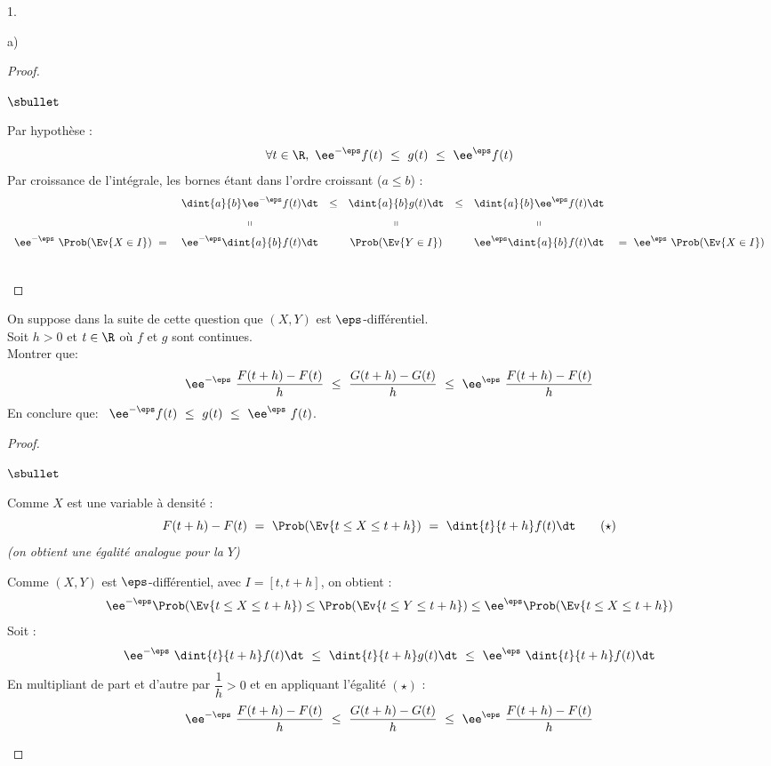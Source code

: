 \documentclass[11pt]{article}%
\begin{document}
\begin{noliste}{1.}
\begin{noliste}{a)}
\begin{proof}
\begin{noliste}{$\sbullet$}
      \item Par hypothèse : 
        \[
        \forall t \in \R, \ \ee^{-\eps} f(t) \ \leq \ g(t) \ \leq \
        \ee^{\eps}f(t)
        \]
        Par croissance de l'intégrale, les bornes étant dans l'ordre
        croissant ($a \leq b$) :
        \[
        \begin{array}{rcccccl}
          & \dint{a}{b} \ee^{-\eps} f(t) \dt & \leq & \dint{a}{b} g(t) 
\dt
          & \leq & \dint{a}{b} \ee^{\eps} f(t) \dt &
          \\[.2cm]
          & \shortparallel & & \shortparallel & & \shortparallel
          \\[.2cm]
          \ee^{-\eps} \ \Prob(\Ev{X \in I}) \ = \ & \ee^{-\eps}
          \dint{a}{b}f(t) \dt & &  \Prob(\Ev{Y \in I}) & & \ee^{\eps}
          \dint{a}{b}f(t) \dt & \ = \ \ee^{\eps} \ \Prob(\Ev{X \in I})
        \end{array}
        \]        
      \end{noliste}
      ~\\[-1.2cm]
    \end{proof}

  \item On suppose dans la suite de cette question que $(X,Y)$ est
    $\eps$-différentiel.\\
    Soit $h>0$ et $t \in \R$ où $f$ et $g$ sont continues.\\[.2cm]
    Montrer que:
    \[
    \ee^{-\eps} \ \dfrac{F(t+h)-F(t)}{h} \ \leq \
    \dfrac{G(t+h)-G(t)}{h} \ \leq \ \ee^{\eps} \
    \dfrac{F(t+h)-F(t)}{h}
    \]
    En conclure que: \ $\ee^{-\eps} f(t) \ \leq \ g(t) \ \leq \
    \ee^{\eps} \ f(t)$.

    \begin{proof}~%
      \begin{noliste}{$\sbullet$}
      \item Comme $X$ est une variable à densité : 
        \[
        F(t+h)-F(t) \ = \ \Prob(\Ev{ t \leq X \leq t+h}) \ = \
        \dint{t}{t+h} f(t) \dt \qquad (\star)
        \]
        {\it (on obtient une égalité analogue pour la \var $Y$)}

      \item Comme $(X,Y)$ est $\eps$-différentiel, avec $I =
        [t, t+h]$, on obtient :
        \[
          \ee^{-\eps} \Prob(\Ev{t \leq X \leq t+h}) \leq 
          \Prob(\Ev{t \leq Y \leq t+h}) \leq \ee^{\eps} 
          \Prob(\Ev{t \leq X \leq t+h})
        \]
        Soit :
        \[
        \ee^{-\eps} \ \dint{t}{t+h} f(t) \dt \ \leq \ \dint{t}{t+h} g(t)
        \dt \ \leq \ \ee^{\eps} \ \dint{t}{t+h} f(t) \dt
        \]
        En multipliant de part et d'autre par $\dfrac{1}{h} > 0$ et en
        appliquant l'égalité $(\star)$ : 
        \[
        \ee^{-\eps} \ \dfrac{F(t+h) - F(t)}{h} \ \leq \ \dfrac{G(t+h)
          - G(t)}{h} \ \leq \ \ee^{\eps} \ \dfrac{F(t+h) - F(t)}{h}
        \]


\end{noliste}
\end{proof}
\end{noliste}
\end{noliste}
\end{document}
